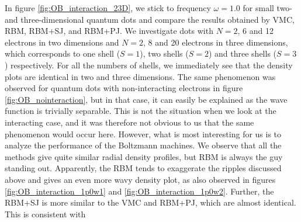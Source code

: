 In figure \eqref{fig:OB_interaction_23D}, we stick to frequency $\omega=1.0$ for small two- and three-dimensional quantum dots and compare the results obtained by VMC, RBM, RBM+SJ, and RBM+PJ. We investigate dots with $N=2$, 6 and 12 electrons in two dimensions and $N=2$, 8 and 20 electrons in three dimensions, which corresponds to one shell ($S=1$), two shells ($S=2$) and three shells ($S=3$) respectively. For all the numbers of shells, we immediately see that the density plots are identical in two and three dimensions. The same phenomenon was observed for quantum dots with non-interacting electrons in figure \eqref{fig:OB_nointeraction}, but in that case, it can easily be explained as the wave function is trivially separable. This is not the situation when we look at the interacting case, and it was therefore not obvious to us that the same phenomenon would occur here. However, what is most interesting for us is to analyze the performance of the Boltzmann machines. We observe that all the methods give quite similar radial density profiles, but RBM is always the guy standing out. Apparently, the RBM tends to exaggerate the ripples discussed above and gives an even more wavy density plot, as also observed in figures \eqref{fig:OB_interaction_1p0w1} and \eqref{fig:OB_interaction_1p0w2}. Further, the RBM+SJ is more similar to the VMC and RBM+PJ, which are almost identical. This is consistent with 
